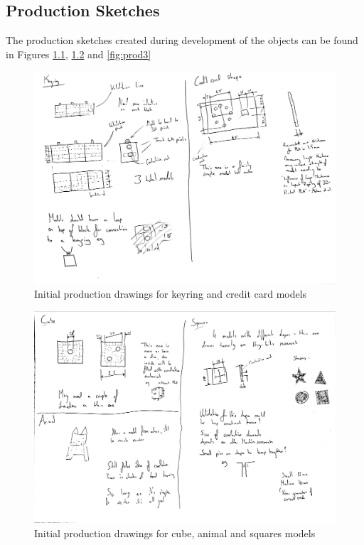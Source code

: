 \documentclass{l4proj}
\begin{document}
\begin{appendices}
\clearpage

\chapter{Production Sketches}
\label{sec:prod}

The production sketches created during development of the objects can be found in Figures \ref{fig:prod1}, \ref{fig:prod2} and \ref{fig:prod3}

\begin{figure}
    \centering
    \includegraphics[width=\linewidth]{Appendices/prod_1.jpg}
    \caption{Initial production drawings for keyring and credit card models}
    \label{fig:prod1}
\end{figure}

\begin{figure}
    \centering
    \includegraphics[width=\linewidth]{Appendices/prod_2.jpg}
    \caption{Initial production drawings for cube, animal and squares models}
    \label{fig:prod2}
\end{figure}


\end{appendices}
\end{document}

